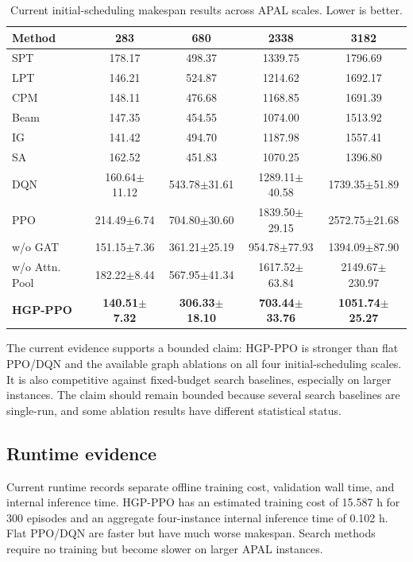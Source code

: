 \begin{table}[t]
\centering
\caption{Current initial-scheduling makespan results across APAL scales. Lower is better.}
\label{tab:initial-main}
\small
\setlength{\tabcolsep}{4pt}
\begin{tabular}{lcccc}
\toprule
Method & 283 & 680 & 2338 & 3182\\
\midrule
SPT & 178.17 & 498.37 & 1339.75 & 1796.69\\
LPT & 146.21 & 524.87 & 1214.62 & 1692.17\\
CPM & 148.11 & 476.68 & 1168.85 & 1691.39\\
Beam & 147.35 & 454.55 & 1074.00 & 1513.92\\
IG & 141.42 & 494.70 & 1187.98 & 1557.41\\
SA & 162.52 & 451.83 & 1070.25 & 1396.80\\
DQN & 160.64$\pm$11.12 & 543.78$\pm$31.61 & 1289.11$\pm$40.58 & 1739.35$\pm$51.89\\
PPO & 214.49$\pm$6.74 & 704.80$\pm$30.60 & 1839.50$\pm$29.15 & 2572.75$\pm$21.68\\
w/o GAT & 151.15$\pm$7.36 & 361.21$\pm$25.19 & 954.78$\pm$77.93 & 1394.09$\pm$87.90\\
w/o Attn. Pool & 182.22$\pm$8.44 & 567.95$\pm$41.34 & 1617.52$\pm$63.84 & 2149.67$\pm$230.97\\
\textbf{HGP-PPO} & \textbf{140.51$\pm$7.32} & \textbf{306.33$\pm$18.10} & \textbf{703.44$\pm$33.76} & \textbf{1051.74$\pm$25.27}\\
\bottomrule
\end{tabular}
\end{table}

The current evidence supports a bounded claim: HGP-PPO is stronger than flat PPO/DQN and the available graph ablations on all four initial-scheduling scales. It is also competitive against fixed-budget search baselines, especially on larger instances. The claim should remain bounded because several search baselines are single-run, and some ablation results have different statistical status.

\subsection{Runtime evidence}

Current runtime records separate offline training cost, validation wall time, and internal inference time. HGP-PPO has an estimated training cost of 15.587 h for 300 episodes and an aggregate four-instance internal inference time of 0.102 h. Flat PPO/DQN are faster but have much worse makespan. Search methods require no training but become slower on larger APAL instances. 

